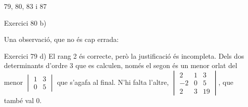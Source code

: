 
%
        {79, 80, 83 i 87}

\begin{errada}{Exercici 80 b)}
\end{errada}


\ifobs
\bigskip
\noindent
Una observació, que no és cap errada:\par\nopagebreak

\begin{observacio}{Exercici 79 d)}
  El rang 2 és correcte, però la justificació és incompleta. Dels dos determinants d'ordre 3 que es calculen, només el segon és un menor orlat del menor $\begin{vmatrix}1&3\\0&5\end{vmatrix}$ que s'agafa al final. N'hi falta l'altre, $\begin{vmatrix}2&1&3\\-2&0&5\\2&3&19\end{vmatrix}$, que també val $0$.
\end{observacio}
\fi
